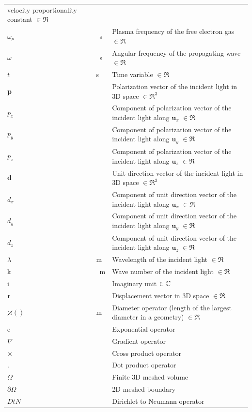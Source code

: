 \documentclass[12pt]{article}
\begin{document}
\begin{longtable*}{l l p{12cm}}
		velocity proportionality constant $\in \Re$ \\ $\omega_p$ & \si{\per \second} &
		Plasma frequency of the free electron gas $\in \Re$ \\ $\omega$ & \si{\per
			\second} & Angular frequency of the propagating wave $\in \Re$ \\ $t$ &
		\si{\second} & Time variable $\in \Re$ \\ \textbf{p} &  & Polarization vector
		of the incident light in 3D space $\in \Re^3$ \\ $p_x$ &  & Component of
		polarization vector of the incident light along $\textbf{u}_x$ $\in \Re$ \\
		$p_y$ &  & Component of polarization vector of the incident light along
		$\textbf{u}_y$ $\in \Re$ \\ $p_z$ &  & Component of polarization vector of the
		incident light along $\textbf{u}_z$ $\in \Re$ \\ \textbf{d} & & Unit direction
		vector of the incident light in 3D space $\in \Re^3$ \\ $d_x$ & & Component of
		unit direction vector of the incident light along $\textbf{u}_x$ $\in \Re$ \\
		$d_y$ & & Component of unit direction vector of the incident light along
		$\textbf{u}_y$ $\in \Re$ \\ $d_z$ & & Component of unit direction vector of the
		incident light along $\textbf{u}_z$ $\in \Re$ \\ $\lambda$ & \si{\meter} &
		Wavelength of the incident light $\in \Re$ \\ k & \si{\per \meter} & Wave
		number of the incident light $\in \Re$ \\ i & & Imaginary unit $\in \Bbb C$ \\
		\textbf{r} &  & Displacement vector in 3D space $\in \Re$ \\ $\varnothing()$ &
		\si{\meter} & Diameter operator (length of the largest diameter in a geometry)
		$\in \Re$ \\ e & & Exponential operator \\ $\nabla$ & & Gradient operator \\
		$\times$ & & Cross product operator \\ $\textbf{.}$ & & Dot product operator \\
		$\Omega$ & & Finite 3D meshed volume \\ $\partial \Omega$ & & 2D meshed
		boundary \\ $DtN$ & & Dirichlet to Neumann operator \\ \bottomrule
	\end{longtable*}
	
\end{document}
